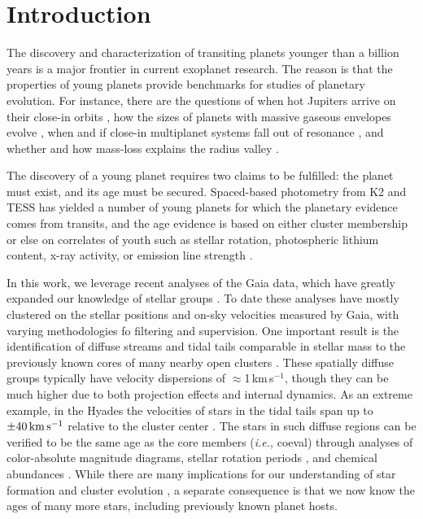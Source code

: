 \documentclass[12pt,twocolumn,linenumbers]{aastex63}
\newcommand{\kms}{\,km\,s$^{-1}$}
\newcommand{\mkms}{{\rm \,km\,s^{-1}}}  %
\begin{document}
\section{Introduction}

The discovery and characterization of transiting planets younger than
a billion years is a major frontier in current exoplanet research.
The reason is that the properties of young planets provide benchmarks
for studies of planetary evolution.  For instance, there are the
questions of when hot Jupiters arrive on their close-in orbits
\citep{dawson_johnson_2018}, how the sizes of planets with massive
gaseous envelopes evolve \citep{rizzuto_tess_2020}, when and if
close-in multiplanet systems fall out of resonance
\citep{arevalo_stability_2022,goldberg_architectures_2022}, and
whether and how mass-loss explains the radius valley
\citep{lopez_how_2012,Owen_Wu_2013,Fulton_et_al_2017,ginzburg_corepowered_2018,lee_primordial_2021}.

The discovery of a young planet requires two claims to be fulfilled:
the planet must exist, and its age must be secured.  Spaced-based
photometry from K2 and TESS has yielded a number of young planets for
which the planetary evidence comes from transits, and the age evidence
is based on either cluster membership
\citep{Mann_et_al_2017,david_four_2019,newton_tess_2019,bouma_cluster_2020,nardiello_pathosII_2020}
or else on correlates of youth such as stellar rotation, photospheric
lithium content, x-ray activity, or emission line strength
\citep{zhou_2021_tois,hedges_toi-2076_2021}.

In this work, we leverage recent analyses of the Gaia data, which have
greatly expanded our knowledge of stellar groups \citep[{\it
e.g.},][]{CantatGaudin2018a,KounkelCovey2019,Kerr2021}.  To date these
analyses have mostly clustered on the stellar positions and on-sky
velocities measured by Gaia, with varying methodologies fo filtering
and supervision.  One important result is the identification of
diffuse streams and tidal tails comparable in stellar mass to the
previously known cores of many nearby open clusters
\citep{meingast_psceri_2019,Meingast2021,gagne_number_2021}.  These
spatially diffuse groups typically have velocity dispersions of
$\approx$1\kms, though they can be much higher due to both projection
effects and internal dynamics.  As an extreme example, in the Hyades
the velocities of stars in the tidal tails span up to $\pm 40\mkms$
relative to the cluster center \citep{jerabkova_800_2021}.  The stars
in such diffuse regions can be verified to be the same age as the core
members ({\it i.e.}, coeval) through analyses of color-absolute
magnitude diagrams, stellar rotation periods
\citep{curtis_tess_2019,bouma_2021_ngc2516}, and chemical abundances
\citep{hawkins_2020}.  While there are many implications for our
understanding of star formation and cluster evolution
\citep{dinnbier_tidal_2020}, a separate consequence is that we now
know the ages of many more stars, including previously known planet
hosts.
\end{document}
